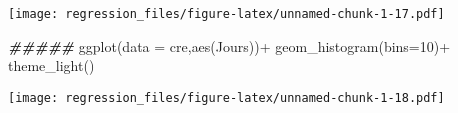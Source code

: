 \documentclass[
]{article}
\newenvironment{Shaded}{\begin{snugshade}}{\end{snugshade}}
\newcommand{\AttributeTok}[1]{\textcolor[rgb]{0.77,0.63,0.00}{#1}}
\newcommand{\DecValTok}[1]{\textcolor[rgb]{0.00,0.00,0.81}{#1}}
\newcommand{\DocumentationTok}[1]{\textcolor[rgb]{0.56,0.35,0.01}{\textbf{\textit{#1}}}}
\newcommand{\FunctionTok}[1]{\textcolor[rgb]{0.00,0.00,0.00}{#1}}
\newcommand{\NormalTok}[1]{#1}
\newcommand{\SpecialCharTok}[1]{\textcolor[rgb]{0.00,0.00,0.00}{#1}}
\begin{document}
\texttt{[image: regression\_files/figure-latex/unnamed-chunk-1-17.pdf]}

\begin{Shaded}
\begin{Highlighting}[]
\DocumentationTok{\#\#\#\#\#}
\FunctionTok{ggplot}\NormalTok{(}\AttributeTok{data =}\NormalTok{ cre,}\FunctionTok{aes}\NormalTok{(Jours))}\SpecialCharTok{+}
  \FunctionTok{geom\_histogram}\NormalTok{(}\AttributeTok{bins=}\DecValTok{10}\NormalTok{)}\SpecialCharTok{+}
  \FunctionTok{theme\_light}\NormalTok{()}
\end{Highlighting}
\end{Shaded}

\texttt{[image: regression\_files/figure-latex/unnamed-chunk-1-18.pdf]}
\end{document}
